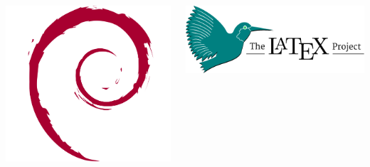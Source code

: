 \begin{frame}
\begin{columns}
        \vspace{7ex}
        \includegraphics[width=\linewidth]{Assets/debian-logo.png}

    \includegraphics[width=\linewidth]{Assets/latex-project-logo.pdf}
    \end{columns}
\end{frame}